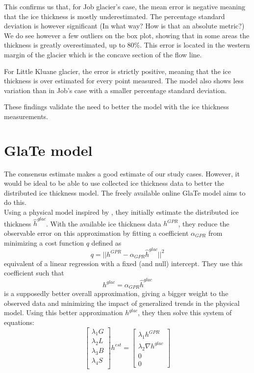 \documentclass[a4, 12pt]{article}
\begin{document}
This confirms us that, for Job glacier's case, the mean error is negative meaning that the ice thickness is mostly underestimated. The percentage standard deviation is however significant (In what way? How is that an absolute metric?) We do see however a few outliers on the box plot, showing that in some areas the thickness is greatly overestimated, up to 80\%. This error is located in the western margin of the glacier which is the concave section of the flow line.

For Little Kluane glacier, the error is strictly positive, meaning that the ice thickness is over estimated for every point measured. The model also shows less variation than in Job's case with a smaller percentage standard deviation.

These findings validate the need to better the model with the ice thickness measurements.

\section{GlaTe model}
The consensus estimate \cite{farinotti2019consensus} makes a good estimate of our study cases. However, 
it would be ideal to be able to use collected ice thickness data to better the distributed ice thickness model. The freely available online GlaTe model \cite{langhammer2019glacier} aims to do this. \\
Using a physical model inspired by \citeauthor{clarke2013ice} \citeyear{clarke2013ice}, they initially estimate the distributed ice thickness $\hat{h}^{glac}$. With the available ice thickness data $h^{GPR}$, they reduce the observable error on this approximation by fitting a coefficient $\alpha_{GPR}$ from  minimizing a cost function $q$ defined as
\[q = ||h^{GPR} - \alpha_{GPR}\hat{h}^{glac}||^2\] 
equivalent of a linear regression with a fixed (and null) intercept. They use this coefficient such that
\[h^{glac} = \alpha_{GPR}\hat{h}^{glac}\]
is a supposedly better overall approximation, giving a bigger weight to the observed data and minimizing the impact of generalized trends in the physical model.
Using this better approximation $h^{glac}$, they then solve this system of equations:
\[
\begin{bmatrix} \lambda_1 G\\ \lambda_2 L\\ \lambda_3 B\\ \lambda_4 S\\ \end{bmatrix}
h^{est} = 
\begin{bmatrix} \lambda_1 h^{GPR}\\ \lambda_2 \nabla h^{glac} \\ 0 \\ 0 \end{bmatrix}
\]
\end{document}
